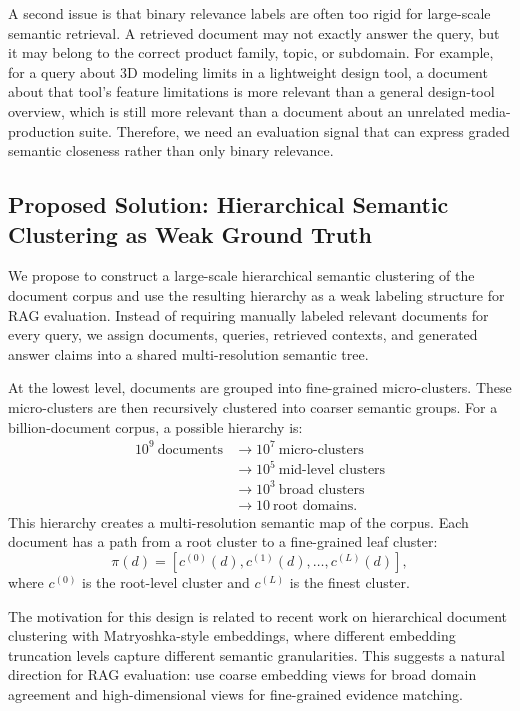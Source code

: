 \documentclass[11pt]{article}
\begin{document}
A second issue is that binary relevance labels are often too rigid for large-scale semantic retrieval. A retrieved document may not exactly answer the query, but it may belong to the correct product family, topic, or subdomain. For example, for a query about 3D modeling limits in a lightweight design tool, a document about that tool's feature limitations is more relevant than a general design-tool overview, which is still more relevant than a document about an unrelated media-production suite. Therefore, we need an evaluation signal that can express graded semantic closeness rather than only binary relevance.

\subsection{Proposed Solution: Hierarchical Semantic Clustering as Weak Ground Truth}

We propose to construct a large-scale hierarchical semantic clustering of the document corpus and use the resulting hierarchy as a weak labeling structure for RAG evaluation. Instead of requiring manually labeled relevant documents for every query, we assign documents, queries, retrieved contexts, and generated answer claims into a shared multi-resolution semantic tree.

At the lowest level, documents are grouped into fine-grained micro-clusters. These micro-clusters are then recursively clustered into coarser semantic groups. For a billion-document corpus, a possible hierarchy is:
\[
\begin{aligned}
10^9\ \text{documents}
&\rightarrow 10^7\ \text{micro-clusters} \\
&\rightarrow 10^5\ \text{mid-level clusters} \\
&\rightarrow 10^3\ \text{broad clusters} \\
&\rightarrow 10\ \text{root domains}.
\end{aligned}
\]
This hierarchy creates a multi-resolution semantic map of the corpus. Each document has a path from a root cluster to a fine-grained leaf cluster:
\[
\pi(d) = [c^{(0)}(d), c^{(1)}(d), \ldots, c^{(L)}(d)],
\]
where $c^{(0)}$ is the root-level cluster and $c^{(L)}$ is the finest cluster.

The motivation for this design is related to recent work on hierarchical document clustering with Matryoshka-style embeddings, where different embedding truncation levels capture different semantic granularities. This suggests a natural direction for RAG evaluation: use coarse embedding views for broad domain agreement and high-dimensional views for fine-grained evidence matching.
\end{document}
